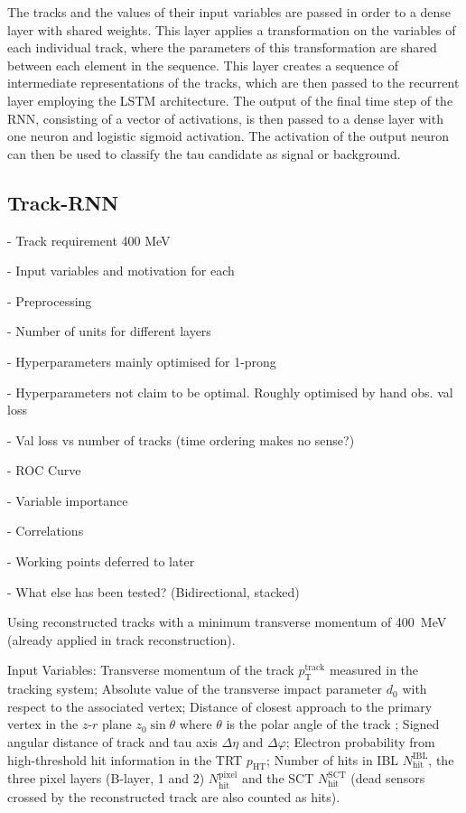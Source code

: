 The tracks and the values of their input variables are passed in order to a
dense layer with shared weights. This layer applies a transformation on the
variables of each individual track, where the parameters of this transformation
are shared between each element in the sequence. This layer creates a sequence
of intermediate representations of the tracks, which are then passed to the
recurrent layer employing the LSTM architecture. The output of the final time
step of the RNN, consisting of a vector of activations, is then passed to a
dense layer with one neuron and logistic sigmoid activation. The activation of
the output neuron can then be used to classify the tau candidate as signal or
background.

\subsection{Track-RNN}
\label{sec:rnn_tracks}

- Track requirement 400 MeV

- Input variables and motivation for each

- Preprocessing



- Number of units for different layers

- Hyperparameters mainly optimised for 1-prong

- Hyperparameters not claim to be optimal. Roughly optimised by hand obs. val loss

- Val loss vs number of tracks (time ordering makes no sense?)



- ROC Curve

- Variable importance

- Correlations



- Working points deferred to later

- What else has been tested? (Bidirectional, stacked)


Using reconstructed tracks with a minimum transverse momentum of
\SI{400}{\mega\electronvolt} (already applied in track reconstruction).

Input Variables: Transverse momentum of the track $p_\text{T}^\text{track}$
measured in the tracking system; Absolute value of the transverse impact
parameter $d_0$ with respect to the associated vertex; Distance of closest
approach to the primary vertex in the $z$-$r$ plane $z_0 \sin\theta$ where
$\theta$ is the polar angle of the track ; Signed angular distance of track and tau axis $\Delta \eta$ and
$\Delta \varphi$; Electron probability from high-threshold hit information in
the TRT $p_\text{HT}$; Number of hits in IBL $N_\text{hit}^\text{IBL}$, the
three pixel layers (B-layer, 1 and 2) $N_\text{hit}^\text{pixel}$ and the SCT
$N_\text{hit}^\text{SCT}$ (dead sensors crossed by the reconstructed track are
also counted as hits).

